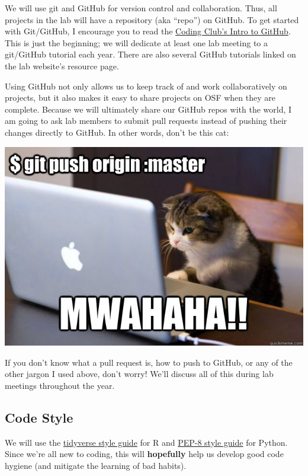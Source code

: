 \documentclass[]{book}
\begin{document}
We will use git and GitHub for version control and collaboration. Thus, all projects in the lab will have a repository (aka ``repo'') on GitHub. To get started with Git/GitHub, I encourage you to read the \href{https://ourcodingclub.github.io/2017/02/27/git.html}{Coding Club's Intro to GitHub}. This is just the beginning; we will dedicate at least one lab meeting to a git/GitHub tutorial each year. There are also several GitHub tutorials linked on the lab website's resource page.

Using GitHub not only allows us to keep track of and work collaboratively on projects, but it also makes it easy to share projects on OSF when they are complete. Because we will ultimately share our GitHub repos with the world, I am going to ask lab members to submit pull requests instead of pushing their changes directly to GitHub. In other words, don't be this cat:

\includegraphics{images/github.png}

If you don't know what a pull request is, how to push to GitHub, or any of the other jargon I used above, don't worry! We'll discuss all of this during lab meetings throughout the year.

\hypertarget{code-style}{%
\subsection{Code Style}\label{code-style}}

We will use the \href{https://style.tidyverse.org/}{tidyverse style guide} for R and \href{https://www.python.org/dev/peps/pep-0008/}{PEP-8 style guide} for Python. Since we're all new to coding, this will \textbf{hopefully} help us develop good code hygiene (and mitigate the learning of bad habits).
\end{document}
